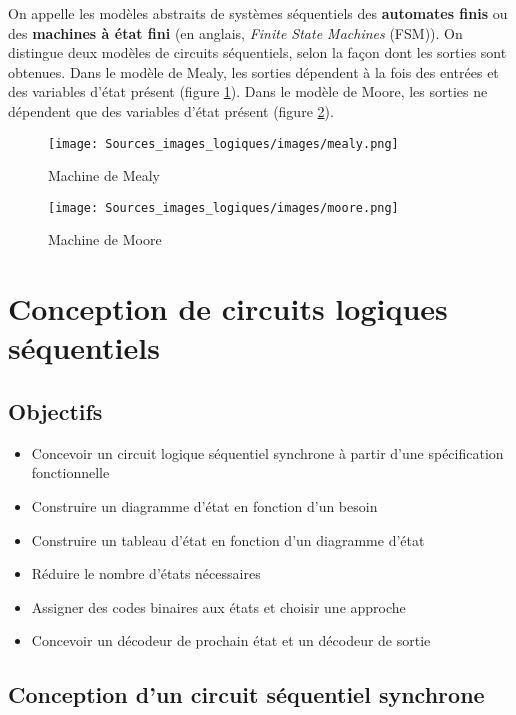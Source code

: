 \documentclass[letter, oneside]{book}
\begin{document}
On appelle les modèles abstraits de systèmes séquentiels des
\textbf{automates finis} ou des \textbf{machines à état fini} (en anglais, \emph{Finite
State Machines} (FSM)).  On distingue deux modèles de circuits
séquentiels, selon la façon dont les sorties sont obtenues. Dans le
modèle de Mealy, les sorties dépendent à la fois des entrées et des
variables d'état présent (figure \ref{fig:org24d1afd}). Dans le modèle de Moore,
les sorties ne dépendent que des variables d'état présent (figure
\ref{fig:org9e4be18}).

\begin{figure}[htbp]
\centering
\texttt{[image: Sources\_images\_logiques/images/mealy.png]}
\caption{\label{fig:org24d1afd}Machine de Mealy}
\end{figure}

\begin{figure}[htbp]
\centering
\texttt{[image: Sources\_images\_logiques/images/moore.png]}
\caption{\label{fig:org9e4be18}Machine de Moore}
\end{figure}

\chapter{Conception de circuits logiques séquentiels}
\label{sec:org974f581}
\section{Objectifs}
\label{sec:org2d08de1}
\begin{itemize}
\item Concevoir un circuit logique séquentiel synchrone à partir
d'une spécification fonctionnelle
\item Construire un diagramme d'état en fonction d'un besoin
\item Construire un tableau d'état en fonction d'un diagramme d'état
\item Réduire le nombre d'états nécessaires
\item Assigner des codes binaires aux états et choisir une approche
\item Concevoir un décodeur de prochain état et un décodeur de sortie
\end{itemize}

\section{Conception d'un circuit séquentiel synchrone}
\label{sec:org6d0fd0b}
\end{document}
